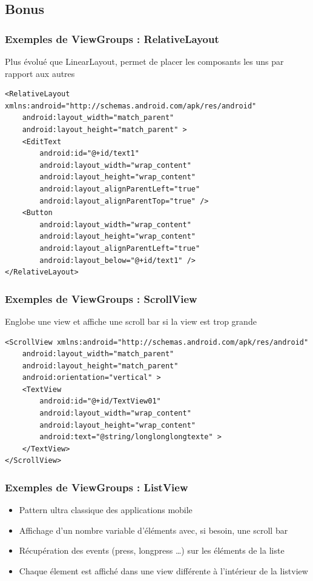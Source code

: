 \documentclass{beamer}
\begin{document}
\subsection{Bonus}
\begin{frame}[fragile]
\frametitle{Exemples de ViewGroups : RelativeLayout}
Plus évolué que LinearLayout, permet de placer les composants les uns par rapport aux autres
\begin{lstlisting}
<RelativeLayout xmlns:android="http://schemas.android.com/apk/res/android"
    android:layout_width="match_parent"
    android:layout_height="match_parent" >
    <EditText
    	android:id="@+id/text1"
        android:layout_width="wrap_content"
        android:layout_height="wrap_content"
        android:layout_alignParentLeft="true"
        android:layout_alignParentTop="true" />
    <Button
        android:layout_width="wrap_content"
        android:layout_height="wrap_content"
        android:layout_alignParentLeft="true"
        android:layout_below="@+id/text1" />
</RelativeLayout> 
\end{lstlisting}
\end{frame}
\begin{frame}[fragile]
\frametitle{Exemples de ViewGroups : ScrollView}
Englobe une view et affiche une scroll bar si la view est trop grande
\begin{lstlisting}
<ScrollView xmlns:android="http://schemas.android.com/apk/res/android"
    android:layout_width="match_parent"
    android:layout_height="match_parent"
    android:orientation="vertical" >
    <TextView
        android:id="@+id/TextView01"
        android:layout_width="wrap_content"
        android:layout_height="wrap_content"
        android:text="@string/longlonglongtexte" >
    </TextView>
</ScrollView> 
\end{lstlisting}
\end{frame}
\begin{frame}[fragile]
\frametitle{Exemples de ViewGroups : ListView}
\begin{itemize}
  \item Pattern ultra classique des applications mobile
  \item Affichage d'un nombre variable d'éléments avec, si besoin, une scroll bar
  \item Récupération des events (press, longpress \ldots) sur les éléments de la liste
  \item Chaque élement est affiché dans une view différente à l'intérieur de la listview
\end{itemize}
\end{frame}
\end{document}
